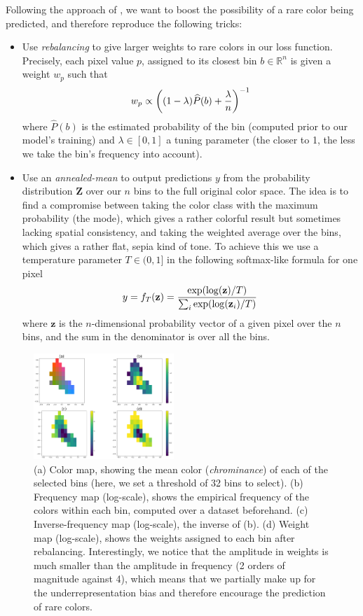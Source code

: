 \documentclass[10pt,twocolumn,letterpaper]{article}
\begin{document}
Following the approach of \cite{zhang2016colorful}, we want to boost the possibility of a rare color being predicted, and therefore reproduce the following tricks:
\begin{itemize}
\item Use \textit{rebalancing} to give larger weights to rare colors in our loss function. Precisely, each pixel value $p$, assigned to its closest bin $b \in \mathbb{R}^n$ is given a weight $w_p$ such that $$w_p \propto \left( (1-\lambda) \widehat{P}(b) + {\lambda \over n} \right)^{-1}$$ where $\widehat{P}(b)$ is the estimated probability of the bin (computed prior to our model's training) and $\lambda \in [0,1]$ a tuning parameter (the closer to 1, the less we take the bin's frequency into account).
\item Use an \textit{annealed-mean} to output predictions $y$ from the probability distribution $\textbf{Z}$ over our $n$ bins to the full original color space. The idea is to find a compromise between taking the color class with the maximum probability (the mode), which gives a rather colorful result but sometimes lacking spatial consistency, and taking the weighted average over the bins, which gives a rather flat, sepia kind of tone. To achieve this we use a temperature parameter $T \in (0,1]$ in the following softmax-like formula for one pixel $$y = f_T(\textbf{z}) = {\exp(\log(\textbf{z}) / T) \over \sum_i \exp(\log(\textbf{z}_i) / T)}$$ where $\textbf{z}$ is the $n$-dimensional probability vector of a given pixel over the $n$ bins, and the sum in the denominator is over all the bins.
\end{itemize}

\begin{figure}
\begin{center}
\includegraphics[width=200px]{cdexample.png}
\caption{(a) Color map, showing the mean color (\textit{chrominance}) of each of the selected bins (here, we set a threshold of 32 bins to select). (b) Frequency map (log-scale), shows the empirical frequency of the colors within each bin, computed over a dataset beforehand. (c) Inverse-frequency map (log-scale), \ie the inverse of (b). (d) Weight map (log-scale), shows the weights assigned to each bin after rebalancing. Interestingly, we notice that the amplitude in weights is much smaller than the amplitude in frequency (2 orders of magnitude against 4), which means that we partially make up for the underrepresentation bias and therefore encourage the prediction of rare colors.}
\label{cdex}
\end{center}
\end{figure}
\end{document}
